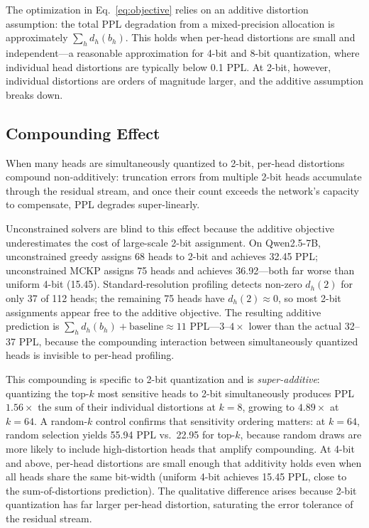 The optimization in Eq.~\eqref{eq:objective} relies on an additive distortion assumption: the total PPL degradation from a mixed-precision allocation is approximately $\sum_h d_h(b_h)$.
This holds when per-head distortions are small and independent---a reasonable approximation for 4-bit and 8-bit quantization, where individual head distortions are typically below 0.1 PPL.
At 2-bit, however, individual distortions are orders of magnitude larger, and the additive assumption breaks down.

\subsection{Compounding Effect}
\label{sec:compounding}

When many heads are simultaneously quantized to 2-bit, per-head distortions compound non-additively: truncation errors from multiple 2-bit heads accumulate through the residual stream, and once their count exceeds the network's capacity to compensate, PPL degrades super-linearly.

Unconstrained solvers are blind to this effect because the additive objective underestimates the cost of large-scale 2-bit assignment.
On Qwen2.5-7B, unconstrained greedy assigns 68 heads to 2-bit and achieves 32.45 PPL; unconstrained MCKP assigns 75 heads and achieves 36.92---both far worse than uniform 4-bit (15.45).
Standard-resolution profiling detects non-zero $d_h(2)$ for only 37 of 112 heads; the remaining 75 heads have $d_h(2) \approx 0$, so most 2-bit assignments appear free to the additive objective.
The resulting additive prediction is $\sum_h d_h(b_h) + \text{baseline} \approx 11$ PPL---$3\text{--}4\times$ lower than the actual 32--37 PPL, because the compounding interaction between simultaneously quantized heads is invisible to per-head profiling.

This compounding is specific to 2-bit quantization and is \emph{super-additive}: quantizing the top-$k$ most sensitive heads to 2-bit simultaneously produces PPL $1.56\times$ the sum of their individual distortions at $k{=}8$, growing to $4.89\times$ at $k{=}64$.
A random-$k$ control confirms that sensitivity ordering matters: at $k{=}64$, random selection yields 55.94 PPL vs.\ 22.95 for top-$k$, because random draws are more likely to include high-distortion heads that amplify compounding.
At 4-bit and above, per-head distortions are small enough that additivity holds even when all heads share the same bit-width (uniform 4-bit achieves 15.45 PPL, close to the sum-of-distortions prediction).
The qualitative difference arises because 2-bit quantization has far larger per-head distortion, saturating the error tolerance of the residual stream.

